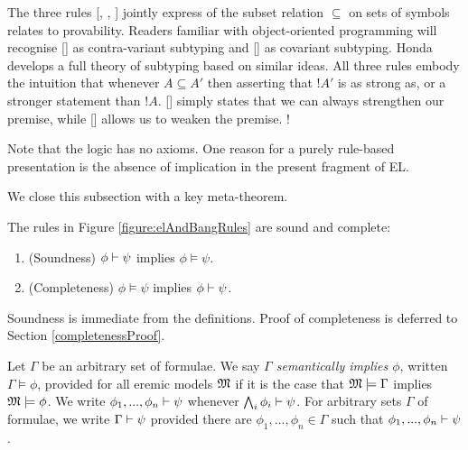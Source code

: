 The three rules [, ,
  ] jointly express of the subset relation
$\subseteq$ on sets of symbols relates to provability. Readers
familiar with object-oriented programming will recognise
[] as contra-variant subtyping and [] as covariant subtyping. Honda \cite{HondaK:thetypftpc}
develops a full theory of subtyping based on similar ideas.  All three
rules embody the intuition that whenever $A \subseteq A'$ then
asserting that $!A'$ is as strong as, or a stronger statement than
$!A$. [] simply states that we can always strengthen
our premise, while [] allows us to weaken the
premise. !

Note that the logic has no axioms. One reason for a purely rule-based
presentation is the absence of implication in the present fragment of
EL. 

We close this subsection with a key meta-theorem.

\begin{theorem}\label{theorem:elAndBang:soundComplete}
The rules in Figure \ref{figure:elAndBangRules} are sound and complete:
\begin{enumerate}

\item\label{theorem:elAndBang:sound} (Soundness) $\phi \vdash \psi$ implies $\phi \models \psi$.

\item\label{theorem:elAndBang:complete} (Completeness) $\phi \models \psi$ implies $\phi \vdash \psi$.

\end{enumerate}
\end{theorem}

\NI Soundness is immediate from the definitions. Proof of completeness is
deferred to Section \ref{completenessProof}. 

\begin{definition}
Let $\Gamma$ be an arbitrary set of formulae. We say \emph{$\Gamma$
  semantically implies $\phi$}, written $\Gamma \models \phi$,
provided for all eremic models $\frak{M}$ if it is the case that $\frak{M}
\models \Gamma$ implies $\frak{M} \models \phi$. We write $\phi_1, ...,
\phi_n \vdash \psi$ whenever $\bigwedge_{i}\phi_i \vdash \psi$.  For
arbitrary sets $\Gamma$ of formulae, we write $\Gamma \vdash \psi$
provided there are $\phi_1, ..., \phi_n \in \Gamma$ such that $\phi_1,
..., \phi_n \vdash \psi$.
\end{definition}

